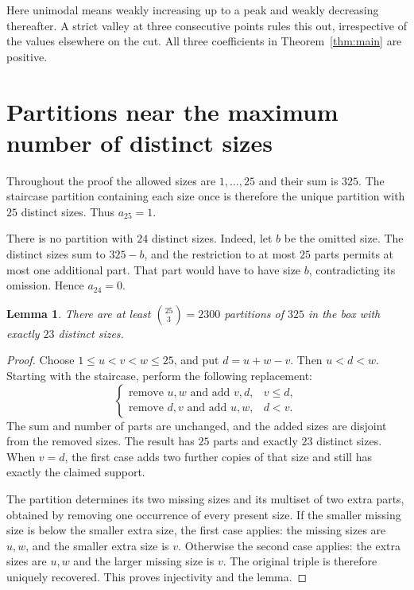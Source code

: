 \documentclass[11pt]{article}
\newtheorem{lemma}[theorem]{Lemma}
\begin{document}
Here unimodal means weakly increasing up to a peak and weakly decreasing
thereafter. A strict valley at three consecutive points rules this out,
irrespective of the values elsewhere on the cut. All three coefficients
in Theorem~\ref{thm:main} are positive.

\section{Partitions near the maximum number of distinct sizes}
Throughout the proof the allowed sizes are $1,\ldots,25$ and their sum
is $325$. The staircase partition containing each size once is therefore
the unique partition with $25$ distinct sizes. Thus $a_{25}=1$.

There is no partition with $24$ distinct sizes. Indeed, let $b$ be the
omitted size. The distinct sizes sum to $325-b$, and the restriction to
at most $25$ parts permits at most one additional part. That part would
have to have size $b$, contradicting its omission. Hence $a_{24}=0$.

\begin{lemma}\label{lem:injection}
There are at least $\binom{25}{3}=2300$ partitions of $325$ in the box
with exactly $23$ distinct sizes.
\end{lemma}
\begin{proof}
Choose $1\le u<v<w\le25$, and put $d=u+w-v$. Then $u<d<w$.
Starting with the staircase, perform the following replacement:
\[
\begin{cases}
\text{remove $u,w$ and add $v,d$},&v\le d,\\
\text{remove $d,v$ and add $u,w$},&d<v.
\end{cases}
\]
The sum and number of parts are unchanged, and the added sizes are
disjoint from the removed sizes. The result has $25$ parts and exactly
$23$ distinct sizes. When $v=d$, the first case adds two further
copies of that size and still has exactly the claimed support.

The partition determines its two missing sizes and its multiset of two
extra parts, obtained by removing one occurrence of every present size.
If the smaller missing size is below the smaller extra size, the first
case applies: the missing sizes are $u,w$, and the smaller extra size is
$v$. Otherwise the second case applies: the extra sizes are $u,w$ and
the larger missing size is $v$. The original triple is therefore
uniquely recovered. This proves injectivity and the lemma.
\end{proof}
\end{document}
